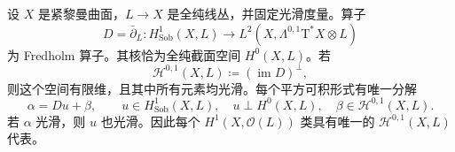 \begin{theorem}
	\label{g4:thm:0303:fredholm}
	设 \(X\) 是紧黎曼曲面，\(L\to X\) 是全纯线丛，并固定光滑度量。算子
	\[
		D=\bar\partial_L:H^1_{\mathrm{Sob}}(X,L)
		\longrightarrow L^2(X,\Lambda^{0,1}\mathrm{T}^*X\otimes L)
	\]
	为 Fredholm 算子。其核恰为全纯截面空间 \(H^0(X,L)\)。若
	\[
		\mathscr H^{0,1}(X,L)
		\coloneqq(\operatorname{im}D)^\perp,
	\]
	则这个空间有限维，且其中所有元素均光滑。每个平方可积形式有唯一分解
	\begin{equation}
		\label{g4:eq:0303:orthogonal-decomposition}
		\alpha=Du+\beta,\qquad
		u\in H^1_{\mathrm{Sob}}(X,L),\quad
		u\perp H^0(X,L),\quad
		\beta\in\mathscr H^{0,1}(X,L).
	\end{equation}
	若 \(\alpha\) 光滑，则 \(u\) 也光滑。因此每个 \(H^1(X,\mathcal O(L))\) 类具有唯一的 \(\mathscr H^{0,1}(X,L)\) 代表。
\end{theorem}
